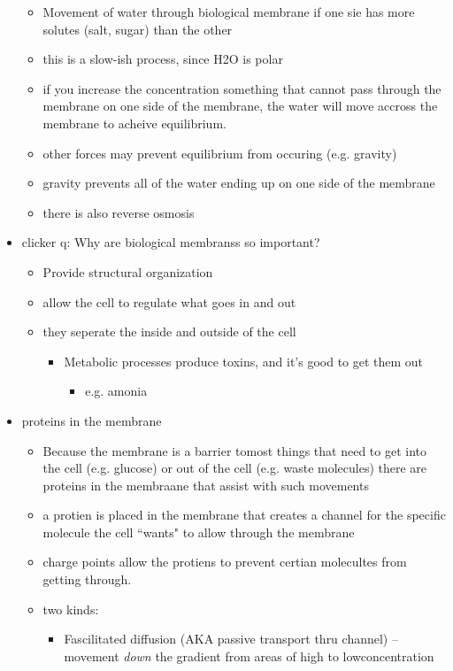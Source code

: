 \documentclass{article}
\theoremstyle{definition}
\begin{document}
\begin{itemize}
\begin{itemize}
			\item Movement of water through biological membrane if one sie has more solutes (salt, sugar) than the other
			\item this is a slow-ish process, since H2O is polar
			\item if you increase the concentration something that cannot pass through the membrane on one side of the membrane, the water will move accross the membrane to acheive equilibrium.
			\item other forces may prevent equilibrium from occuring  (e.g. gravity)
			\item gravity prevents all of the water ending up on one side of the membrane
			\item there is also reverse osmosis
		\end{itemize}
	\item clicker q: Why are biological membranss so important?
		\begin{itemize}
			\item Provide structural organization
			\item allow the cell to regulate what goes in and out
			\item they seperate the inside and outside of the cell
				\begin{itemize}
					\item Metabolic processes produce toxins, and it's good to get them out
						\begin{itemize}
							\item e.g. amonia
						\end{itemize}
				\end{itemize}
		\end{itemize}
	\item proteins in the membrane
		\begin{itemize}
			\item Because the membrane is a barrier tomost things that need to get into the cell (e.g. glucose) or out of the cell (e.g. waste molecules) there are proteins in the membraane that assist with such  movements
			\item a protien is placed in the membrane that creates a channel for the specific molecule the cell ``wants" to allow through the membrane
			\item charge points allow the protiens to prevent certian molecultes from getting through.
			\item two kinds:
				\begin{itemize}
					\item Fascilitated diffusion (AKA passive transport thru channel) -- movement \textit{down}  the gradient from areas of high to lowconcentration

\end{itemize}
\end{itemize}
\end{itemize}
\end{document}
